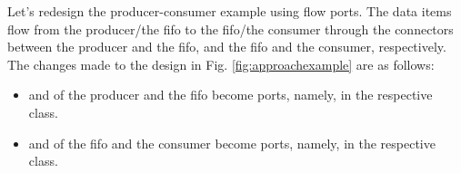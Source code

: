 Let's redesign the producer-consumer example using flow ports.
The data items flow from the producer/the fifo to the fifo/the consumer through the connectors between the producer and the fifo, and the fifo and the consumer, respectively.
The changes made to the design in Fig. \ref{fig:approachexample}  are as follows:

\begin{itemize}
	\item {} and  of the producer and the fifo become  ports, namely,  in the respective class.
	
	\item {} and  of the fifo and the consumer become  ports, namely,  in the respective class.
\end{itemize} 


